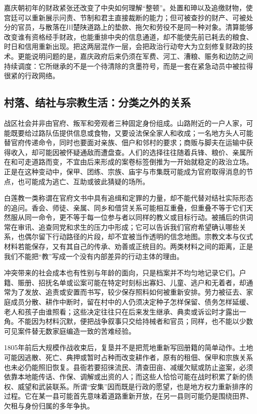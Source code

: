嘉庆朝初年的财政紧张还改变了中央如何理解“整顿”。处置和珅以及追缴财物，使宫廷可以重新展示问责、节制和君主直接裁断的能力；但可被查抄的财产、可被处分的官员，与散落在川楚陕道路上的垫款、拖欠和劳役不是同一种对象。清算能够改变谁有资格经手财政，也能重排中央的信息通道，却不能使先前已耗去的粮食、时日和信用重新出现。把这两层混作一层，会把政治行动夸大为立刻修复财政的技术。更能说明问题的是，嘉庆政府后来仍须在军费、河工、漕粮、赈务和边防之间持续调度：它所继承的不是一个待清除的贪墨符号，而是一套在紧急动员中被拉得很紧的行政网络。

\subsection{村落、结社与宗教生活：分类之外的关系}

战区社会并非由官府、叛军和旁观者三种固定身份组成。山路附近的一户人家，可能既要给过路队伍提供信息或食物，又要设法保全家人和收成；一名地方头人可能替官府传递命令，同时也要面对亲族、佃户和邻村的要求；商贩与脚夫在运输中获得收入，却可能因被怀疑通敌而遭盘查。人们的选择往往随着兵锋、粮价、亲属所在和可走道路而变，不宜由后来形成的案卷标签倒推为一开始就稳定的政治立场。正是在这种变动中，保甲、团练、宗族、庙宇与市集既可能成为官府取得消息的节点，也可能成为逃亡、互助或彼此猜疑的场所。

白莲教一类称谓在官府文书中具有追缉和定罪的力量，却不能代替对结社实际形态的追问。香会、师徒、亲属、同乡和借贷关系可能相互重叠，但重叠不等于它们天然服从同一命令，更不等于每一位参与者以同样的教义或目标行动。被捕后的供词常在审讯、追查同党和求生的压力中形成；它可以告诉我们官府希望确认哪些关系，也偶尔留下行动路径的片段，却不宜被当作透明的信念地图。宗教文本与仪式材料若能保存，又有其自己的传承、劝善或正统目的。两类材料之间的距离，正是我们不能把“教”写成一个没有内部差异的行动主体的理由。

冲突带来的社会成本也有性别与年龄的面向，只是档案并不均匀地记录它们。户籍、赈册、招抚名单或讼案可能在特定时刻标出寡妇、儿童、逃户和无着者，却通常为了发放、追责或安置而书写，较少保存照料如何被重新安排。劳力被征去、家庭成员分散、耕作中断时，留在村中的人仍须决定种子怎样保留、债务怎样延缓、老人和孩子由谁照看；这些决定往往只在后来发生继承、典卖或诉讼时才露出一角。不能因为材料沉默，便把战争叙事只交给持械者和官员；同样，也不能以少数可见案件替无数家庭编造一致的苦难经验。

1805年前后大规模作战收束后，复垦并不是把荒地重新写回册籍的简单动作。土地可能因逃散、死亡、典押或暂时占种而改变耕作者，原有的租佃、保甲和宗族关系也未必仍能照旧恢复。县衙若要招徕流民、清查田亩、减缓欠赋或防止盗案，必须依靠本地能传话、作保、调解或出资的人；而这些人恰恰可能在战时积累了新的债权、威望和武装联系。所谓“安集”因而既是行政的愿望，也是地方权力重新排序的过程。它在某一县可能首先意味着道路重新开放，在另一县则可能仍是围绕田界、欠租与身份归属的多年争执。

